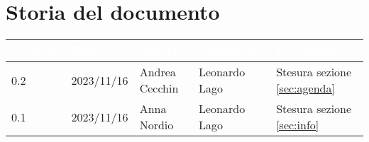 \section{Storia del documento} \label{sec:storia}
\begingroup
\setlength{\tabcolsep}{10pt}
\renewcommand{\arraystretch}{1.5}
\begin{tabularx}{\textwidth}{| l | l | X | X | X |}
    \hline
    \rowcolor{headerrow} \textbf{\textcolor{white}{Versione}} & \textbf{\textcolor{white}{Data}} & \textbf{\textcolor{white}{Autori}} & \textbf{\textcolor{white}{Verificatori}} & \textbf{\textcolor{white}{Descrizione}} \\
    \hline
    0.2 & 2023/11/16 & Andrea Cecchin & Leonardo Lago & Stesura sezione \ref{sec:agenda}\\
    \hline
    0.1 & 2023/11/16 & Anna Nordio & Leonardo Lago & Stesura sezione \ref{sec:info}\\
    \hline
\end{tabularx}
\endgroup
